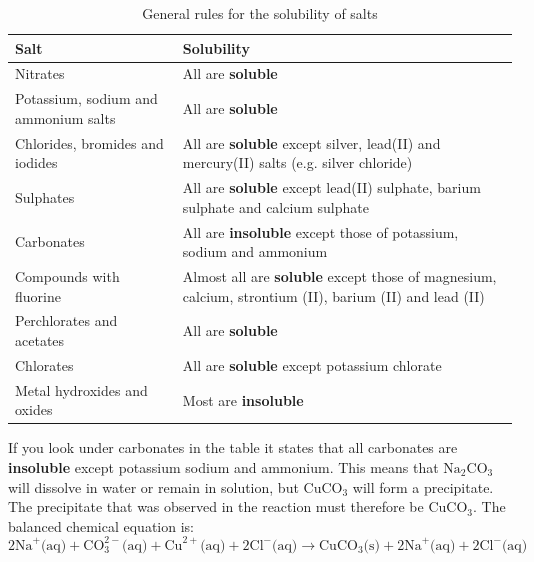           \begin{table}[H]
        \begin{center}
      \label{m38719*uid69}
    \noindent
      \begin{tabular}{|l|p{8cm}|}\hline
                \textbf{Salt}
               &
                \textbf{Solubility} \\ \hline
        Nitrates &
        All are \textbf{soluble} \\ \hline
        Potassium, sodium and ammonium salts &
        All are \textbf{soluble} \\ \hline
        Chlorides, bromides and iodides &
        All are \textbf{soluble} except silver, lead(II) and mercury(II) salts (e.g. silver chloride) \\ \hline
        Sulphates &
        All are \textbf{soluble} except lead(II) sulphate, barium sulphate and calcium sulphate \\ \hline
        Carbonates &
        All are \textbf{insoluble} except those of potassium, sodium and ammonium \\ \hline
        Compounds with fluorine &
        Almost all are \textbf{soluble} except those of magnesium, calcium, strontium (II), barium (II) and lead (II) \\ \hline
        Perchlorates and acetates &
        All are \textbf{soluble} \\ \hline
        Chlorates &
        All are \textbf{soluble} except potassium chlorate \\ \hline
        Metal hydroxides and oxides &
        Most are \textbf{insoluble} \\ \hline
    \end{tabular}
      \end{center}
    \caption{General rules for the solubility of salts}
\label{tab:solubility}
\end{table}
If you look under carbonates in the table it states that all carbonates are \textbf{insoluble} except potassium sodium and ammonium. This means that $\text{Na}_{2}\text{CO}_3$ will dissolve in water or remain in solution, but $\text{CuCO}_3$ will form a precipitate. The precipitate that was observed in the reaction must therefore be $\text{CuCO}_3$. The balanced chemical equation is:
\begin{equation*}
2\text{Na}^{+} \text{(aq)} + \text{CO}_{3}^{2-} \text{(aq)} + \text{Cu}^{2+} \text{(aq)} + 2\text{Cl}^{-} \text{(aq)} \to \text{CuCO}_{3} \text{(s)} +  2\text{Na}^{+} \text{(aq)} + 2\text{Cl}^{-} \text{(aq)}
\end{equation*}

